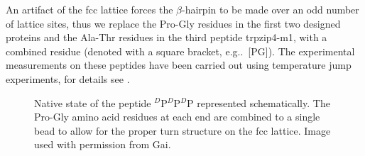 An artifact of the fcc lattice forces the $\beta$-hairpin to be made over an odd number of lattice sites, thus we replace the Pro-Gly residues in the first two designed proteins and the Ala-Thr residues in the third peptide trpzip4-m1, with a combined residue (denoted with a square bracket, e.g..\ [PG]). The experimental measurements on these peptides have been carried out using temperature jump experiments, for details see \cite{du_understanding_2006,xu_probing_2008}.
\begin{figure}[ht]
\caption{Native state of the peptide $^D$P$^D$P$^D$P represented schematically. The Pro-Gly amino acid residues at each end are combined to a single bead to allow for the proper turn structure on the fcc lattice. Image used with permission from Gai.\cite{xu_probing_2008}}
\end{figure}

